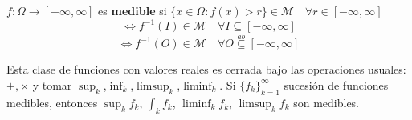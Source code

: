 \begin{fdefinition}
    $f:\Omega\to [-\infty,\infty]$ es \textbf{medible} si $\{x\in \Omega:f(x)>r\}\in\mathcal{M}\quad \forall r\in[-\infty,\infty]$
    \[\iff f^{-1}(I)\in \mathcal{M}\quad\forall I\subseteq [-\infty,\infty]\]
    \[\iff f^{-1}(O)\in\mathcal{M}\quad\forall O\overset{ab}{\subseteq}[-\infty,\infty]\]
\end{fdefinition}

Esta clase de funciones con valores reales es cerrada bajo las operaciones usuales: $+,\times$ y tomar $\sup_k$,$\inf_k$,$\limsup_k$,$\liminf_k$. Si $\{f_k\}_{k=1}^\infty$ sucesión de funciones medibles, entonces $\sup_k f_k$, $\int_k f_k$, $\liminf_k f_k$, $\limsup_k f_k$ son medibles.